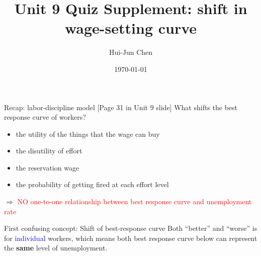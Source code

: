 \documentclass{beamer}
\title{Unit 9 Quiz Supplement: shift in wage-setting curve}
\author{Hui-Jun Chen}
\institute{The Ohio State University}
\date{\today}
\newcommand{\blue}[1]{\textcolor{blue}{#1}}
\newcommand{\red}[1]{\textcolor{red}{#1}}
\begin{document}
\maketitle


\begin{frame}{Recap: labor-discipline model}
\label{slide:Recap__labor_discipline_model}
    [Page 31 in Unit 9 slide] What shifts the best response curve of workers?
    \begin{itemize}
        \item the utility of the things that the wage can buy
        \item the disutility of effort
        \item the reservation wage
        \item the probability of getting fired at each effort level
    \end{itemize}
    $ \Rightarrow  $ \red{NO one-to-one relationship between best response curve and unemployment rate}
\end{frame}

\begin{frame}{First confusing concept: Shift of best-response curve}
\label{First_confusing_concept__Shift_of_best_response_curve}
    Both ``better'' and ``worse'' is for \blue{individual} workers, which means both best response curve below can represent the \textbf{same} level of unemployment.


\end{frame}
\end{document}
